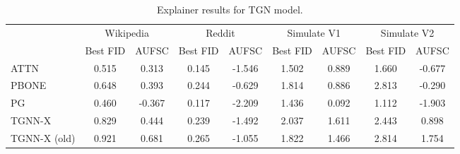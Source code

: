 \begin{table}
\centering
\begin{tabular}{lcccccccc}
\toprule
 & \multicolumn{2}{c}{Wikipedia} & \multicolumn{2}{c}{Reddit} & \multicolumn{2}{c}{Simulate V1} & \multicolumn{2}{c}{Simulate V2} \\
 & Best FID & AUFSC & Best FID & AUFSC & Best FID & AUFSC & Best FID & AUFSC \\
\midrule
ATTN & 0.515 & 0.313 & 0.145 & -1.546 & 1.502 & 0.889 & 1.660 & -0.677 \\
PBONE & 0.648 & 0.393 & 0.244 & -0.629 & 1.814 & 0.886 & 2.813 & -0.290 \\
PG & 0.460 & -0.367 & 0.117 & -2.209 & 1.436 & 0.092 & 1.112 & -1.903 \\
TGNN-X & 0.829 & 0.444 & 0.239 & -1.492 & 2.037 & 1.611 & 2.443 & 0.898 \\
TGNN-X (old) & 0.921 & 0.681 & 0.265 & -1.055 & 1.822 & 1.466 & 2.814 & 1.754 \\
\bottomrule
\end{tabular}
\caption{\label{tab:tgn_results}Explainer results for TGN model.}
\end{table}
